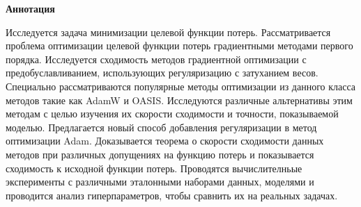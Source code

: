 \begin{center}
    \Large{\textbf{Аннотация}}
\end{center}

Исследуется задача минимизации целевой функции потерь. Рассматривается проблема оптимизации целевой функции потерь градиентными методами первого порядка. Исследуется сходимость методов градиентной оптимизации с предобуславливанием, использующих регуляризацию с затуханием весов. 
Специально рассматриваются популярные методы оптимизации из данного класса методов такие как AdamW и OASIS.
Исследуются различные альтернативы этим методам с целью изучения их скорости сходимости и точности, показываемой моделью.
Предлагается новый способ добавления регуляризации в метод оптимизации Adam. 
Доказывается теорема о скорости сходимости данных методов при различных допущениях на функцию потерь и показывается сходимость к исходной функции потерь.
Проводятся вычислителньые эксперименты с различными эталонными наборами данных, моделями и проводится анализ гиперпараметров, чтобы сравнить их на реальных задачах.


